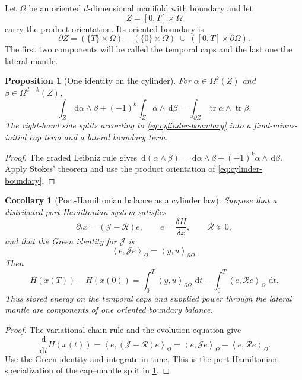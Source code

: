 \documentclass[11pt,a4paper]{article}
\newtheorem{proposition}[theorem]{Proposition}
\newtheorem{corollary}[theorem]{Corollary}
\newcommand{\dd}{\,\mathrm d}
\newcommand{\ip}[2]{\left\langle #1,#2\right\rangle}
\begin{document}
Let \(\Omega\) be an oriented \(d\)-dimensional manifold with boundary
and let
\[
 Z=[0,T]\times\Omega
\]
carry the product orientation.  Its oriented boundary is
\begin{equation}\label{eq:cylinder-boundary}
 \partial Z=
 (\{T\}\times\Omega)-(\{0\}\times\Omega)
 \;\cup\;([0,T]\times\partial\Omega).
\end{equation}
The first two components will be called the temporal caps and the last one
the lateral mantle.

\begin{proposition}[One identity on the cylinder]
\label{prop:continuous-cylinder}
For \(\alpha\in\Omega^k(Z)\) and
\(\beta\in\Omega^{d-k}(Z)\),
\begin{equation}\label{eq:continuous-stokes-cylinder}
 \int_Z \dd\alpha\wedge\beta
 +(-1)^k\int_Z\alpha\wedge\dd\beta
 =\int_{\partial Z}\operatorname{tr}\alpha\wedge
                   \operatorname{tr}\beta.
\end{equation}
The right-hand side splits according to
\cref{eq:cylinder-boundary} into a final-minus-initial cap term and a
lateral boundary term.
\end{proposition}

\begin{proof}
The graded Leibniz rule gives
\(
 \dd(\alpha\wedge\beta)
 =\dd\alpha\wedge\beta+(-1)^k\alpha\wedge\dd\beta
\).
Apply Stokes' theorem and use the product orientation of
\cref{eq:cylinder-boundary}.
\end{proof}

\begin{corollary}[Port-Hamiltonian balance as a cylinder law]
\label{cor:continuous-ph-cylinder}
Suppose that a distributed port-Hamiltonian system satisfies
\[
 \partial_t x=(\mathcal J-\mathcal R)e,
 \qquad e=\frac{\delta H}{\delta x},
 \qquad \mathcal R\succeq0,
\]
and that the Green identity for \(\mathcal J\) is
\[
 \ip{e}{\mathcal J e}_{\Omega}
 =\ip{y}{u}_{\partial\Omega}.
\]
Then
\begin{equation}\label{eq:continuous-power-cylinder}
 H(x(T))-H(x(0))
 =\int_0^T\ip{y}{u}_{\partial\Omega}\,\dd t
  -\int_0^T\ip{e}{\mathcal R e}_{\Omega}\,\dd t.
\end{equation}
Thus stored energy on the temporal caps and supplied power through the
lateral mantle are components of one oriented boundary balance.
\end{corollary}

\begin{proof}
The variational chain rule and the evolution equation give
\[
 \frac{\dd}{\dd t}H(x(t))
 =\ip{e}{(\mathcal J-\mathcal R)e}_{\Omega}
 =\ip{e}{\mathcal J e}_{\Omega}
  -\ip{e}{\mathcal R e}_{\Omega}.
\]
Use the Green identity and integrate in time.  This is the
port-Hamiltonian specialization of the cap--mantle split in
\cref{prop:continuous-cylinder}.
\end{proof}
\end{document}
